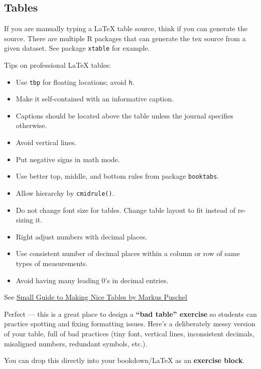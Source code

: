 \documentclass[
]{book}
\providecommand{\tightlist}{%
  \setlength{\itemsep}{0pt}\setlength{\parskip}{0pt}}
\theoremstyle{definition}
\theoremstyle{definition}
\theoremstyle{definition}
\theoremstyle{definition}
\theoremstyle{remark}
\begin{document}
\subsection{Tables}\label{tables}

If you are manually typing a LaTeX table source, think if you can generate the
source. There are multiple R packages that can generate the tex source from a
given dataset. See package \texttt{xtable} for example.

Tips on professional LaTeX tables:

\begin{itemize}
\tightlist
\item
  Use \texttt{tbp} for floating locations; avoid \texttt{h}.
\item
  Make it self-contained with an informative caption.
\item
  Captions should be located above the table unless the journal specifies
  otherwise.
\item
  Avoid vertical lines.
\item
  Put negative signs in math mode.
\item
  Use better top, middle, and bottom rules from package \texttt{booktabs}.
\item
  Allow hierarchy by \texttt{cmidrule()}.
\item
  Do not change font size for tables. Change table layout to fit instead of
  re-sizing it.
\item
  Right adjust numbers with decimal places.
\item
  Use consistent number of decimal places within a column or row of same types
  of measurements.
\item
  Avoid having many leading 0's in decimal entries.
\end{itemize}

See \href{https://people.inf.ethz.ch/markusp/teaching/guides/guide-tables.pdf}{Small Guide to Making Nice Tables by Markus
Puschel}

Perfect --- this is a great place to design a \textbf{``bad table'' exercise} so students can practice spotting and fixing formatting issues. Here's a deliberately messy version of your table, full of bad practices (tiny font, vertical lines, inconsistent decimals, misaligned numbers, redundant symbols, etc.).

You can drop this directly into your bookdown/LaTeX as an \textbf{exercise block}.
\end{document}
